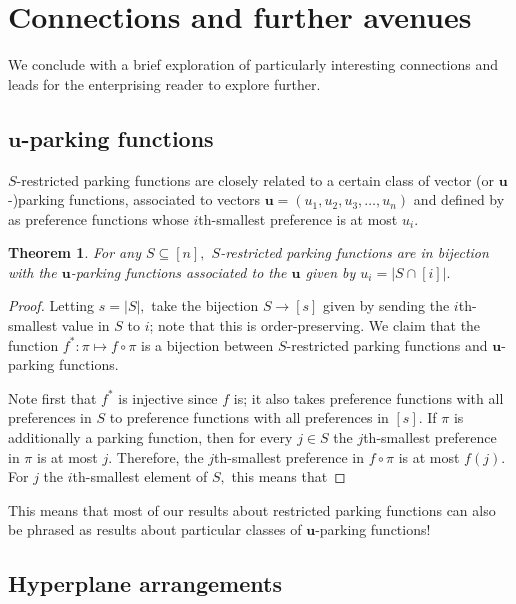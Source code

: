 \documentclass[12 pt]{amsart}
\newtheorem{theorem}{Theorem}[section]
\theoremstyle{definition} %
\theoremstyle{remark} %
\begin{document}
\section{Connections and further avenues}

We conclude with a brief exploration of particularly interesting connections and leads for the enterprising reader to explore further.

\subsection{$\mathbf{u}$-parking functions}

$S$-restricted parking functions are closely related to a certain class of vector (or $\mathbf{u}$-)parking functions, associated to vectors $\mathbf{u}=(u_1,u_2,u_3,\ldots,u_n)$ and defined by \cite{} as preference functions whose $i$th-smallest preference is at most $u_i.$

\begin{theorem}
    For any $S\subseteq[n],$ $S$-restricted parking functions are in bijection with the $\mathbf{u}$-parking functions associated to the $\mathbf{u}$ given by $u_i=|S\cap [i]|.$
\end{theorem}
\begin{proof}
    Letting $s=|S|,$ take the bijection $S\to [s]$ given by sending the $i$th-smallest value in $S$ to $i$; note that this is order-preserving. We claim that the function $f^*: \pi\mapsto f\circ \pi$ is a bijection between $S$-restricted parking functions and $\mathbf{u}$-parking functions.

    Note first that $f^*$ is injective since $f$ is; it also takes preference functions with all preferences in $S$ to preference functions with all preferences in $[s].$ If $\pi$ is additionally a parking function, then for every $j\in S$ the $j$th-smallest preference in $\pi$ is at most $j.$ Therefore, the $j$th-smallest preference in $f\circ\pi$ is at most $f(j).$ For $j$ the $i$th-smallest element of $S,$ this means that 
\end{proof}


This means that most of our results about restricted parking functions can also be phrased as results about particular classes of $\mathbf{u}$-parking functions!

\subsection{Hyperplane arrangements}
\end{document}

